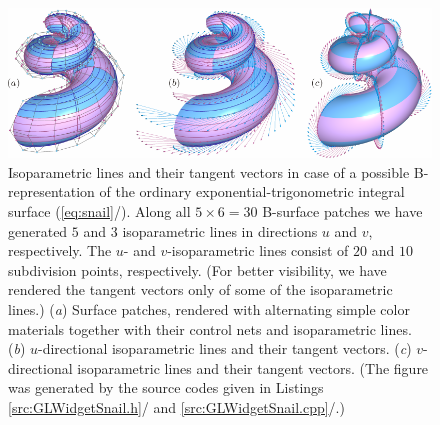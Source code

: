 \documentclass[b5paper, twosided]{book}
\DeclareRobustCommand{\mref}[1]{\ref{#1}{\relsize{-1}/\pageref{#1}}}
\begin{document}
\begin{figure}[!htb]
    \centering
    \includegraphics[]{images/isoparametric_lines_snail_user_manual.pdf}
    \caption{Isoparametric lines and their tangent vectors in case of a possible B-representation of the ordinary exponential-trigonometric integral surface (\mref{eq:snail}). Along all $5\times 6 = 30$ B-surface patches we have generated $5$ and $3$ isoparametric lines in directions $u$ and $v$, respectively. The $u$- and $v$-isoparametric lines consist of $20$ and $10$ subdivision points, respectively. (For better visibility, we have rendered the tangent vectors only of some of the isoparametric lines.) (\textit{a}) Surface patches, rendered with alternating simple color materials together with their control nets and isoparametric lines. (\textit{b}) $u$-directional isoparametric lines and their tangent vectors. (\textit{c}) $v$-directional isoparametric lines and their tangent vectors. (The figure was generated by the source codes given in Listings \mref{src:GLWidgetSnail.h} and \mref{src:GLWidgetSnail.cpp}.)}
    \label{fig:isoparametric_lines_user_manual}
\end{figure}

\backmatter



\end{document}
